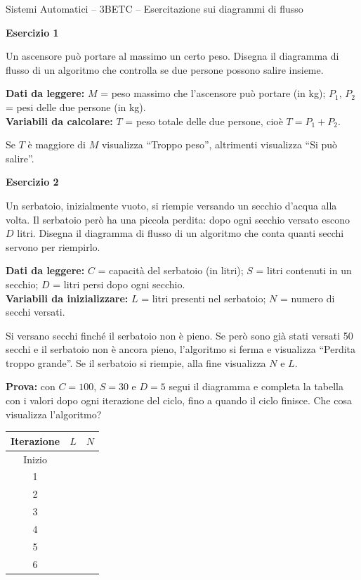 \documentclass[a4paper,11pt]{article}
\newcommand{\titolo}[1]{%
  \begin{center}
    {\small Sistemi Automatici -- 3BETC -- Esercitazione sui diagrammi di flusso\par}
    \vspace{4pt}{\Large\bfseries #1\par}
  \end{center}\vspace{6pt}}
\begin{document}
\titolo{Esercitazione sui diagrammi di flusso}

\textbf{Esercizio 1}

Un ascensore può portare al massimo un certo peso. Disegna il diagramma di flusso di un algoritmo
che controlla se due persone possono salire insieme.

\textbf{Dati da leggere:} $M$ = peso massimo che l'ascensore può portare (in kg);
$P_1$, $P_2$ = pesi delle due persone (in kg).\\
\textbf{Variabili da calcolare:} $T$ = peso totale delle due persone, cioè $T = P_1 + P_2$.

Se $T$ è maggiore di $M$ visualizza ``Troppo peso'', altrimenti visualizza ``Si può salire''.

\bigskip
\textbf{Esercizio 2}

Un serbatoio, inizialmente vuoto, si riempie versando un secchio d'acqua alla volta. Il serbatoio
però ha una piccola perdita: dopo ogni secchio versato escono $D$ litri. Disegna il diagramma di
flusso di un algoritmo che conta quanti secchi servono per riempirlo.

\textbf{Dati da leggere:} $C$ = capacità del serbatoio (in litri); $S$ = litri contenuti in un
secchio; $D$ = litri persi dopo ogni secchio.\\
\textbf{Variabili da inizializzare:} $L$ = litri presenti nel serbatoio; $N$ = numero di secchi versati.

Si versano secchi finché il serbatoio non è pieno. Se però sono già stati versati 50 secchi e il
serbatoio non è ancora pieno, l'algoritmo si ferma e visualizza ``Perdita troppo grande''.
Se il serbatoio si riempie, alla fine visualizza $N$ e $L$.

\textbf{Prova:} con $C = 100$, $S = 30$ e $D = 5$ segui il diagramma e completa la tabella con i
valori dopo ogni iterazione del ciclo, fino a quando il ciclo finisce. Che cosa visualizza l'algoritmo?
\begin{center}\renewcommand{\arraystretch}{1.35}
\begin{tabular}{|c|p{3cm}|p{3cm}|}\hline
  Iterazione & $L$ & $N$\\\hline
  Inizio & &\\\hline
  1 & &\\\hline
  2 & &\\\hline
  3 & &\\\hline
  4 & &\\\hline
  5 & &\\\hline
  6 & &\\\hline
\end{tabular}\end{center}
\end{document}
